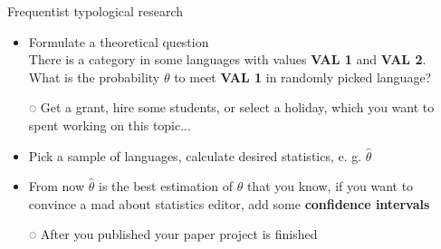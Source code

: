 \documentclass[13pt, t]{beamer}
\begin{document}
\begin{frame}{Frequentist typological research}
\begin{itemize}
\item Formulate a theoretical question\\
There is a category in some languages with values \textbf{VAL 1} and \textbf{VAL 2}. \pause \\
What is the probability $\theta$ to meet \textbf{VAL 1} in randomly picked language? \pause
\item[◌] Get a grant, hire some students, or select a holiday, which you want to spent working on this topic... \pause
\item Pick a sample of languages, calculate desired statistics, e. g. $\hat{\theta}$ \pause
\item From now $\hat{\theta}$ is the best estimation of $\theta$ that you know\pause, if you want to convince a mad about statistics editor, add some \textbf{confidence intervals}
\item[◌] After you published your paper project is finished
\end{itemize}
\end{frame}
\end{document}
